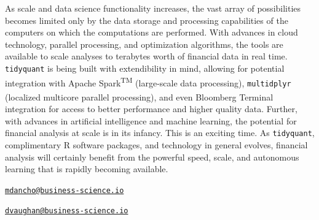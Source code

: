 As scale and data science functionality increases, the vast array of
possibilities becomes limited only by the data storage and processing
capabilities of the computers on which the computations are performed.
With advances in cloud technology, parallel processing, and optimization
algorithms, the tools are available to scale analyses to terabytes worth
of financial data in real time. \texttt{tidyquant} is being built with
extendibility in mind, allowing for potential integration with Apache
Spark\textsuperscript{TM} (large-scale data processing),
\texttt{multidplyr} (localized multicore parallel processing), and even
Bloomberg Terminal\textsuperscript{\textregistered} integration for
access to better performance and higher quality data. Further, with
advances in artificial intelligence and machine learning, the potential
for financial analysis at scale is in its infancy. This is an exciting
time. As \texttt{tidyquant}, complimentary R software packages, and
technology in general evolves, financial analysis will certainly benefit
from the powerful speed, scale, and autonomous learning that is rapidly
becoming available.

\pagebreak



\address{%
Matt Dancho\\
Business Science\\
\\
}
\href{mailto:mdancho@business-science.io}{\nolinkurl{mdancho@business-science.io}}

\address{%
Davis Vaughan\\
Business Science\\
\\
}
\href{mailto:dvaughan@business-science.io}{\nolinkurl{dvaughan@business-science.io}}


